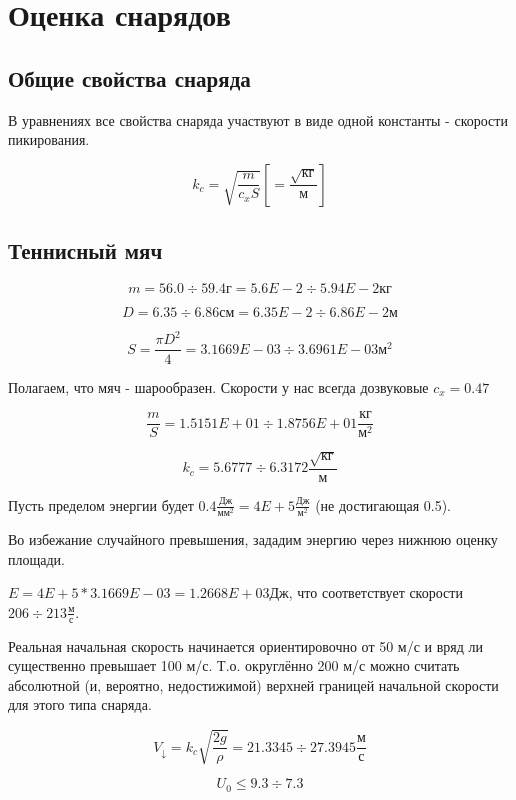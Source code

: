 \section{Оценка снарядов}
\subsection{Общие свойства снаряда}
В уравнениях все свойства снаряда участвуют в виде одной константы - скорости пикирования.

$$k_c = \sqrt{\frac{m}{c_{x} S}} \left [ =\frac{\sqrt{\mbox{кг}}}{\mbox{м}} \right ]$$

\subsection{Теннисный мяч}

$$m = 56.0 \div 59.4 \mbox{г} = 5.6E-2 \div 5.94E-2 \mbox{кг}$$

$$D = 6.35 \div 6.86 \mbox{см} = 6.35E-2 \div 6.86E-2 \mbox{м}$$

$$S = \frac{\pi D^2}{4} = 3.1669E-03 \div 3.6961E-03 \mbox{м}^2$$

Полагаем, что мяч - шарообразен. Скорости у нас всегда дозвуковые
$c_x = 0.47$

$$\frac{m}{S} = 1.5151E+01 \div 1.8756E+01 \frac{\mbox{кг}}{\mbox{м}^2}$$

$$k_c = 5.6777 \div 6.3172 \frac{\sqrt{\mbox{кг}}}{\mbox{м}}$$

Пусть пределом энергии будет $0.4 \frac{\mbox{Дж}}{\mbox{мм}^2} = 4E+5 \frac{\mbox{Дж}}{\mbox{м}^2}$ (не достигающая 0.5).

Во избежание случайного превышения, зададим энергию через нижнюю оценку площади.

$E = 4E+5 * 3.1669E-03 = 1.2668E+03 \mbox{Дж}$, что соответствует скорости $206 \div 213 \frac{\mbox{м}}{\mbox{с}}$.

Реальная начальная скорость начинается ориентировочно от 50 м/с и вряд ли существенно превышает 100 м/с. Т.о. округлённо 200 м/с можно считать абсолютной (и, вероятно, недостижимой) верхней границей начальной скорости для этого типа снаряда.

$$V_{\downarrow}=k_c \sqrt{\frac{2g}{\rho}} = 21.3345 \div 27.3945 \frac{\mbox{м}}{\mbox{с}}$$

$$U_0 \leq 9.3 \div 7.3 $$
